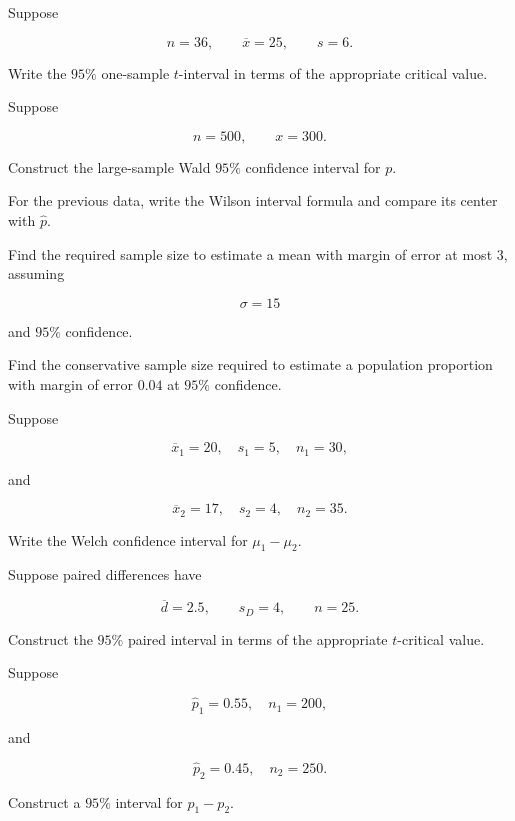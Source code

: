 \begin{exercise}[2]
Suppose

\[
n=36,
\qquad
\overline{x}=25,
\qquad
s=6.
\]

Write the \(95\%\) one-sample \(t\)-interval in terms of the appropriate
critical value.
\end{exercise}

\begin{exercise}[2]
Suppose

\[
n=500,
\qquad
x=300.
\]

Construct the large-sample Wald \(95\%\) confidence interval for \(p\).
\end{exercise}

\begin{exercise}[2]
For the previous data, write the Wilson interval formula and compare its
center with \(\widehat{p}\).
\end{exercise}

\begin{exercise}[2]
Find the required sample size to estimate a mean with margin of error at
most \(3\), assuming

\[
\sigma=15
\]

and \(95\%\) confidence.
\end{exercise}

\begin{exercise}[2]
Find the conservative sample size required to estimate a population
proportion with margin of error \(0.04\) at \(95\%\) confidence.
\end{exercise}

\begin{exercise}[2]
Suppose

\[
\overline{x}_1=20,
\quad
s_1=5,
\quad
n_1=30,
\]

and

\[
\overline{x}_2=17,
\quad
s_2=4,
\quad
n_2=35.
\]

Write the Welch confidence interval for \(\mu_1-\mu_2\).
\end{exercise}

\begin{exercise}[2]
Suppose paired differences have

\[
\overline{d}=2.5,
\qquad
s_D=4,
\qquad
n=25.
\]

Construct the \(95\%\) paired interval in terms of the appropriate
\(t\)-critical value.
\end{exercise}

\begin{exercise}[2]
Suppose

\[
\widehat{p}_1=0.55,
\quad
n_1=200,
\]

and

\[
\widehat{p}_2=0.45,
\quad
n_2=250.
\]

Construct a \(95\%\) interval for \(p_1-p_2\).
\end{exercise}


